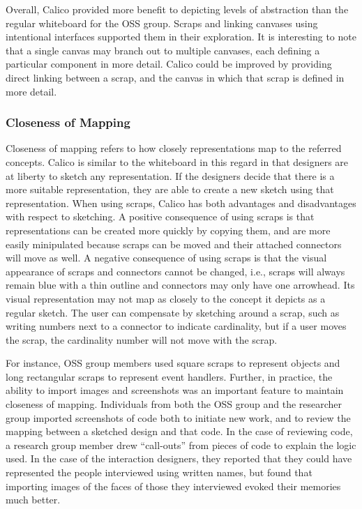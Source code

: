 Overall, Calico provided more benefit to depicting levels of abstraction than the regular whiteboard for the OSS group. Scraps and linking canvases using intentional interfaces supported them in their exploration. It is interesting to note that a single canvas may branch out to multiple canvases, each defining a particular component in more detail. Calico could be improved by providing direct linking between a scrap, and the canvas in which that scrap is defined in more detail.

%

\subsubsection{Closeness of Mapping}
Closeness of mapping refers to how closely representations map to the referred concepts. Calico is similar to the whiteboard in this regard in that designers are at liberty to sketch any representation. If the designers decide that there is a more suitable representation, they are able to create a new sketch using that representation. When using scraps, Calico has both advantages and disadvantages with respect to sketching. A positive consequence of using scraps is that representations can be created more quickly by copying them, and are more easily minipulated because scraps can be moved and their attached connectors will move as well. A negative consequence of using scraps is that the visual appearance of scraps and connectors cannot be changed, i.e., scraps will always remain blue with a thin outline and connectors may only have one arrowhead. Its visual representation may not map as closely to the concept it depicts as a regular sketch. The user can compensate by sketching around a scrap, such as writing numbers next to a connector to indicate cardinality, but if a user moves the scrap, the cardinality number will not move with the scrap.

For instance, OSS group members used square scraps to represent objects and long rectangular scraps to represent event handlers. Further, in practice, the ability to import images and screenshots was an important feature to maintain closeness of mapping. Individuals from both the OSS group and the researcher group imported screenshots of code both to initiate new work, and to review the mapping between a sketched design and that code. In the case of reviewing code, a research group member drew ``call-outs'' from pieces of code to explain the logic used. In the case of the interaction designers, they reported that they could have represented the people interviewed using written names, but found that importing images of the faces of those they interviewed evoked their memories much better.

